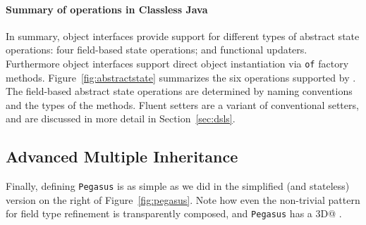 \paragraph{Summary of operations in Classless Java}
In summary, object interfaces provide support for
different types of abstract state operations: four field-based state
operations; and functional updaters. Furthermore object interfaces support
direct object instantiation via \texttt{of} factory methods.
Figure~\ref{fig:abstractstate} summarizes the six operations supported
by \mixin. The field-based abstract state operations are determined by
naming conventions and the types of the methods. Fluent setters are a variant of
conventional setters, and are discussed in more detail in Section~\ref{sec:dsls}.

\subsection{Advanced Multiple Inheritance}
Finally, defining \texttt{Pegasus} is as simple as we did in the simplified
(and stateless) version on the right of Figure~\ref{fig:pegasus}.
 Note how even the non-trivial pattern for field type refinement is
transparently composed, and \texttt{Pegasus} has a \Q@Point3D@
\Q@location@.%



